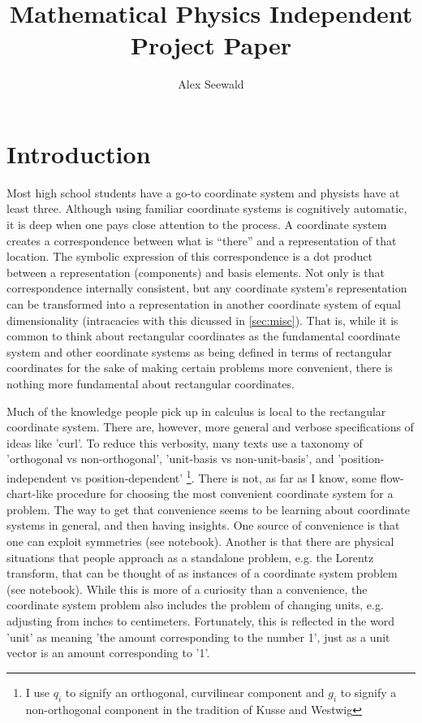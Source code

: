 \documentclass{article}
\author{Alex Seewald}
\title{Mathematical Physics Independent Project Paper}
\begin{document}
\newcommand{\unit}[1]{ \hat{\mathbf{e}_{#1}} }
\newcommand{\skewunit}[1]{ \hat{\mathbf{g}_{#1}} }
\newcommand{\partialfrac}[2]{\frac{\partial{#1}}{\partial{#2}}}
\newcommand{\norm}[1]{\lvert #1 \rvert}

\nocite{*}


\maketitle

\tableofcontents

\section*{Introduction}

Most high school students have a go-to coordinate system and physists have at least three. Although using familiar coordinate systems is cognitively automatic, it is deep when one pays close attention to the process. A coordinate system creates a correspondence between what is “there” and a representation of that location. The symbolic expression of this correspondence is a dot product between a representation (components) and basis elements. Not only is that correspondence internally consistent, but any coordinate system’s representation can be transformed into a representation in another coordinate system of equal dimensionality (intracacies with this dicussed in \cref{sec:misc}). That is, while it is common to think about rectangular coordinates as the fundamental coordinate system and other coordinate systems as being defined in terms of rectangular coordinates for the sake of making certain problems more convenient, there is nothing more fundamental about rectangular coordinates.

Much of the knowledge people pick up in calculus is local to the rectangular coordinate system. There are, however, more general and verbose specifications of ideas like 'curl'. To reduce this verbosity, many texts use a taxonomy of 'orthogonal vs non-orthogonal', 'unit-basis vs non-unit-basis', and 'position-independent vs position-dependent' \footnote{I use $q_i$ to signify an orthogonal, curvilinear component and $g_i$ to signify a non-orthogonal component in the tradition of Kusse and Westwig}. There is not, as far as I know, some flow-chart-like procedure for choosing the most convenient coordinate system for a problem. The way to get that convenience seems to be learning about coordinate systems in general, and then having insights. One source of convenience is that one can exploit symmetries (see notebook). Another is that there are physical situations that people approach as a standalone problem, e.g. the Lorentz transform, that can be thought of as instances of a coordinate system problem (see notebook). While this is more of a curiosity than a convenience, the coordinate system problem also includes the problem of changing units, e.g. adjusting from inches to centimeters. Fortunately, this is reflected in the word 'unit' as meaning 'the amount corresponding to the number 1', just as a unit vector is an amount corresponding to '1'.
\end{document}
